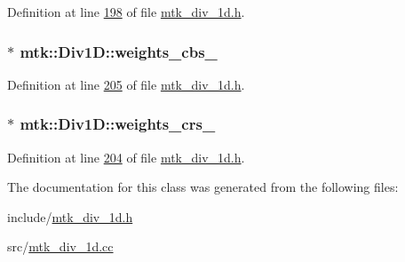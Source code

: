 Definition at line \hyperlink{mtk__div__1d_8h_source_l00198}{198} of file \hyperlink{mtk__div__1d_8h_source}{mtk\+\_\+div\+\_\+1d.\+h}.

\hypertarget{classmtk_1_1Div1D_a631dad42a0ec0f5d5ac767abdfd8949c}{
\subsubsection[{weights\+\_\+cbs\+\_\+}]{$\ast$ mtk\+::\+Div1\+D\+::weights\+\_\+cbs\+\_\+\hspace{0.3cm}{\ttfamily [private]}}}\label{classmtk_1_1Div1D_a631dad42a0ec0f5d5ac767abdfd8949c}


Definition at line \hyperlink{mtk__div__1d_8h_source_l00205}{205} of file \hyperlink{mtk__div__1d_8h_source}{mtk\+\_\+div\+\_\+1d.\+h}.

\hypertarget{classmtk_1_1Div1D_ad36dcfade921f0488fe3edaecc17bd75}{
\subsubsection[{weights\+\_\+crs\+\_\+}]{$\ast$ mtk\+::\+Div1\+D\+::weights\+\_\+crs\+\_\+\hspace{0.3cm}{\ttfamily [private]}}}\label{classmtk_1_1Div1D_ad36dcfade921f0488fe3edaecc17bd75}


Definition at line \hyperlink{mtk__div__1d_8h_source_l00204}{204} of file \hyperlink{mtk__div__1d_8h_source}{mtk\+\_\+div\+\_\+1d.\+h}.



The documentation for this class was generated from the following files\+:\begin{DoxyCompactItemize}
\item 
include/\hyperlink{mtk__div__1d_8h}{mtk\+\_\+div\+\_\+1d.\+h}\item 
src/\hyperlink{mtk__div__1d_8cc}{mtk\+\_\+div\+\_\+1d.\+cc}\end{DoxyCompactItemize}
